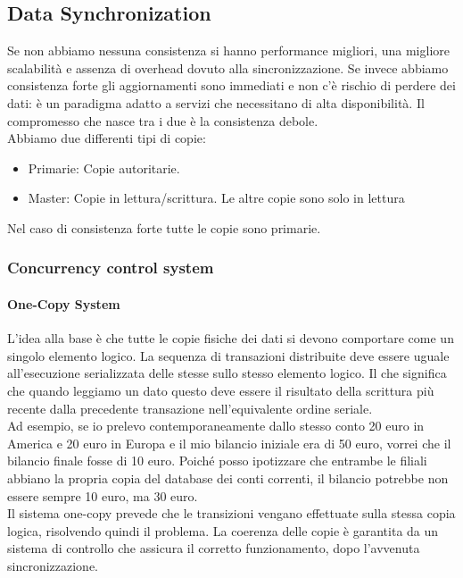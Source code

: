 \documentclass{article}
\begin{document}
		\subsection{Data Synchronization}
		Se non abbiamo nessuna consistenza si hanno performance migliori, una migliore scalabilità e assenza di overhead dovuto alla sincronizzazione.
		Se invece abbiamo consistenza forte gli aggiornamenti sono immediati e non c'è rischio di perdere dei dati: è un paradigma adatto a servizi che necessitano di alta disponibilità. Il compromesso che nasce tra i due è la consistenza debole.\\
		
		Abbiamo due differenti tipi di copie:
		\begin{itemize}
		    \item Primarie: Copie autoritarie.
		    \item Master: Copie in lettura/scrittura. Le altre copie sono solo in lettura
		\end{itemize}
		Nel caso di consistenza forte tutte le copie sono primarie.
		
		\subsubsection{Concurrency control system}
		\paragraph{One-Copy System} L'idea alla base è che tutte le copie fisiche dei dati si devono comportare come un singolo elemento logico. La sequenza di transazioni distribuite deve essere uguale all'esecuzione serializzata delle stesse sullo stesso elemento logico. Il che significa che quando leggiamo un dato questo deve essere il risultato della scrittura più recente dalla precedente transazione nell'equivalente ordine seriale.\\
		
		Ad esempio, se io prelevo contemporaneamente dallo stesso conto 20 euro in America e 20 euro in Europa e il mio bilancio iniziale era di 50 euro, vorrei che il bilancio finale fosse di 10 euro. Poiché posso ipotizzare che entrambe le filiali abbiano la propria copia del database dei conti correnti, il bilancio potrebbe non essere sempre 10 euro, ma 30 euro.\\		
		
		Il sistema one-copy prevede che le transizioni vengano effettuate sulla stessa copia logica, risolvendo quindi il problema. 
		La coerenza delle copie è garantita da un sistema di controllo che assicura il corretto funzionamento, dopo l'avvenuta sincronizzazione.	
		
\end{document}
